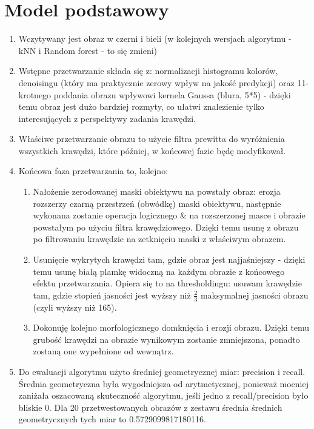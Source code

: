 \documentclass[12pt]{article}
\begin{document}
\section{Model podstawowy}
\begin {enumerate}
	\item Wczytywany jest obraz w czerni i bieli (w kolejnych wersjach algorytmu - kNN i Random forest - to się zmieni)
	\item Wstępne przetwarzanie składa się z: normalizacji histogramu kolorów, denoisingu (który ma praktycznie zerowy wpływ na jakość predykcji) oraz 11-krotnego poddania obrazu wpływowi kernela Gaussa (blura, 5*5) - dzięki temu obraz jest dużo bardziej rozmyty, co ułatwi znalezienie tylko interesujących z perspektywy zadania krawędzi.
	\item Właściwe przetwarzanie obrazu to użycie filtra prewitta do wyróżnienia wszystkich krawędzi, które później, w końcowej fazie będę modyfikował.
	\item Końcowa faza przetwarzania to, kolejno:
	\begin{enumerate}
		\item Nałożenie zerodowanej maski obiektywu na powstały obraz: erozja rozszerzy czarną przestrzeń (obwódkę) maski obiektywu, następnie wykonana zostanie operacja logicznego \& na rozszerzonej masce i obrazie powstałym po użyciu filtra krawędziowego. Dzięki temu usunę z obrazu po filtrowaniu krawędzie na zetknięciu maski z właściwym obrazem.
		\item Usunięcie wykrytych krawędzi tam, gdzie obraz jest najjaśniejszy - dzięki temu usunę białą plamkę widoczną na każdym obrazie z końcowego efektu przetwarzania. Opiera się to na thresholdingu: usuwam krawędzie tam, gdzie stopień jasności jest wyższy niż \(\frac{2}{3}\) maksymalnej jasności obrazu (czyli wyższy niż 165).
		\item Dokonuję kolejno morfologicznego domknięcia i erozji obrazu. Dzięki temu grubość krawędzi na obrazie wynikowym zostanie zmniejszona, ponadto zostaną one wypełnione od wewnątrz.
	\end{enumerate}
	\item Do ewaluacji algorytmu użyto średniej geometrycznej miar: precision i recall. Średnia geometryczna była wygodniejsza od arytmetycznej, ponieważ mocniej zaniżała oszacowaną skuteczność algorytmu, jeśli jedno z recall/precision było bliskie 0. Dla 20 przetwestowanych obrazów z zestawu średnia średnich geometrycznych tych miar to 0.5729099817180116.
\end {enumerate}
\end{document}
